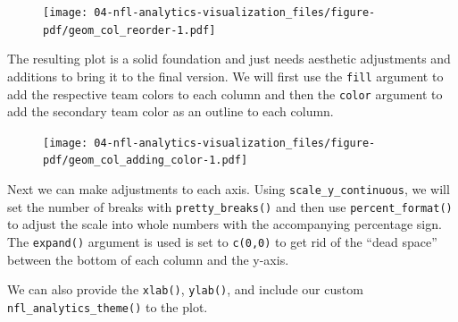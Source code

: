 \documentclass[
  letterpaper,
]{krantz}
\newenvironment{Shaded}{\begin{snugshade}}{\end{snugshade}}
\newcommand{\AttributeTok}[1]{\textcolor[rgb]{0.40,0.45,0.13}{#1}}
\newcommand{\FunctionTok}[1]{\textcolor[rgb]{0.28,0.35,0.67}{#1}}
\newcommand{\NormalTok}[1]{\textcolor[rgb]{0.00,0.23,0.31}{#1}}
\newcommand{\SpecialCharTok}[1]{\textcolor[rgb]{0.37,0.37,0.37}{#1}}
\begin{document}
\begin{figure}[H]

{\centering \texttt{[image: 04-nfl-analytics-visualization\_files/figure-pdf/geom\_col\_reorder-1.pdf]}

}

\end{figure}

The resulting plot is a solid foundation and just needs aesthetic
adjustments and additions to bring it to the final version. We will
first use the \texttt{fill} argument to add the respective team colors
to each column and then the \texttt{color} argument to add the secondary
team color as an outline to each column.

\begin{Shaded}
\end{Shaded}

\begin{figure}[H]

{\centering \texttt{[image: 04-nfl-analytics-visualization\_files/figure-pdf/geom\_col\_adding\_color-1.pdf]}

}

\end{figure}

Next we can make adjustments to each axis. Using
\texttt{scale\_y\_continuous}, we will set the number of breaks with
\texttt{pretty\_breaks()} and then use \texttt{percent\_format()} to
adjust the scale into whole numbers with the accompanying percentage
sign. The \texttt{expand()} argument is used is set to \texttt{c(0,0)}
to get rid of the ``dead space'' between the bottom of each column and
the y-axis.

We can also provide the \texttt{xlab()}, \texttt{ylab()}, and include
our custom \texttt{nfl\_analytics\_theme()} to the plot.
\end{document}
